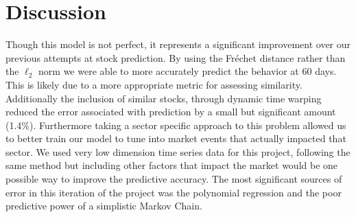 \documentclass{article}
\begin{document}
\section{Discussion}
	Though this model is not perfect, it represents a significant improvement over our previous attempts at stock prediction. By using the Fréchet distance rather than the $\ell_2$ norm we were able to more accurately predict the behavior at 60 days. This is likely due to a more appropriate metric for assessing similarity. Additionally the inclusion of similar stocks, through dynamic time warping reduced the error associated with prediction by a small but significant amount (1.4\%). Furthermore taking a sector specific approach to this problem allowed us to better train our model to tune into market events that actually impacted that sector. We used very low dimension time series data for this project, following the same method but including other factors that impact the market would be one possible way to improve the predictive accuracy. The most significant sources of error in this iteration of the project was the polynomial regression and the poor predictive power of a simplistic Markov Chain. 
\end{document}
